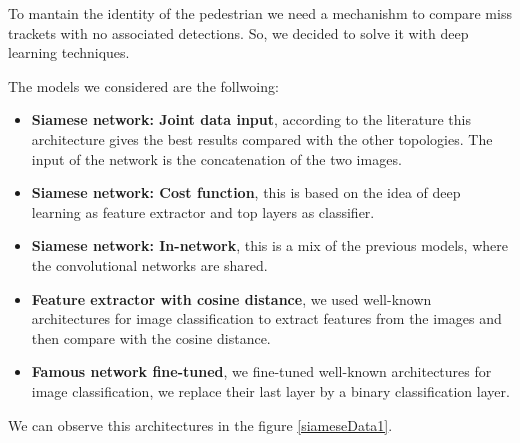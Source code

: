 \documentclass[12pt, a4paper, titlepage,twoside,openright]{article}
\begin{document}
To mantain the identity of the pedestrian we need a mechanishm to compare miss trackets with no associated detections. So, we decided to solve it with deep learning techniques.


The models we considered are the follwoing:


\begin{itemize}

\item \textbf{Siamese network: Joint data input}, according to the literature this architecture gives the best results compared with the other topologies. The input of the network is the concatenation of the two images. 

\item \textbf{Siamese network: Cost function}, this is based on the idea of deep learning as feature extractor and top layers as classifier.

\item \textbf{Siamese network: In-network}, this is a mix of the previous models, where the convolutional networks are shared.

\item \textbf{Feature extractor with cosine distance}, we used well-known architectures for image classification to extract features from the images and then compare with the cosine distance.


\item \textbf{Famous network fine-tuned}, we fine-tuned  well-known architectures for image classification, we replace their last layer by a binary classification layer.


\end{itemize}

We can observe this architectures in the figure \ref{siameseData1}.
\end{document}
